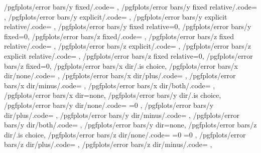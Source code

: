 {	/pgfplots/error bars/y fixed/.code=				\def\pgfplots@errorbars@yfixed{#1}\def\pgfplots@errorbars@ymode{0},
	/pgfplots/error bars/y fixed relative/.code=		\def\pgfplots@errorbars@yrel{#1}\def\pgfplots@errorbars@ymode{1},
	/pgfplots/error bars/y explicit/.code=			\def\pgfplots@errorbars@ymode{2},
	/pgfplots/error bars/y explicit relative/.code=	\def\pgfplots@errorbars@ymode{3},
	/pgfplots/error bars/y fixed relative=0,
	/pgfplots/error bars/y fixed=0,
	/pgfplots/error bars/z fixed/.code=				\def\pgfplots@errorbars@zfixed{#1}\def\pgfplots@errorbars@zmode{0},
	/pgfplots/error bars/z fixed relative/.code=		\def\pgfplots@errorbars@zrel{#1}\def\pgfplots@errorbars@zmode{1},
	/pgfplots/error bars/z explicit/.code=			\def\pgfplots@errorbars@zmode{2},
	/pgfplots/error bars/z explicit relative/.code=	\def\pgfplots@errorbars@zmode{3},
	/pgfplots/error bars/z fixed relative=0,
	/pgfplots/error bars/z fixed=0,
	/pgfplots/error bars/x dir/.is choice,
	/pgfplots/error bars/x dir/none/.code={%
		\def\pgfplots@errorbars@xdirection{0}%
		\ifnum{}
			\ifnum{}
				\pgfplots@errorbars@enabledfalse
			\fi
		\fi
	},
	/pgfplots/error bars/x dir/plus/.code=				\def\pgfplots@errorbars@xdirection{1}\pgfplots@errorbars@enabledtrue,
	/pgfplots/error bars/x dir/minus/.code=				\def\pgfplots@errorbars@xdirection{2}\pgfplots@errorbars@enabledtrue,
	/pgfplots/error bars/x dir/both/.code=				\def\pgfplots@errorbars@xdirection{3}\pgfplots@errorbars@enabledtrue,
	/pgfplots/error bars/x dir=none,
	/pgfplots/error bars/y dir/.is choice,
	/pgfplots/error bars/y dir/none/.code={%
		\def\pgfplots@errorbars@ydirection{0}%
		\ifnum\pgfplots@errorbars@xdirection=0
			\ifnum{}
				\pgfplots@errorbars@enabledfalse
			\fi
		\fi
	},
	/pgfplots/error bars/y dir/plus/.code=				\def\pgfplots@errorbars@ydirection{1}\pgfplots@errorbars@enabledtrue,
	/pgfplots/error bars/y dir/minus/.code=				\def\pgfplots@errorbars@ydirection{2}\pgfplots@errorbars@enabledtrue,
	/pgfplots/error bars/y dir/both/.code=				\def\pgfplots@errorbars@ydirection{3}\pgfplots@errorbars@enabledtrue,
	/pgfplots/error bars/y dir=none,
	/pgfplots/error bars/z dir/.is choice,
	/pgfplots/error bars/z dir/none/.code={%
		\def\pgfplots@errorbars@zdirection{0}%
		\ifnum\pgfplots@errorbars@xdirection=0
			\ifnum\pgfplots@errorbars@ydirection=0
				\pgfplots@errorbars@enabledfalse
			\fi
		\fi
	},
	/pgfplots/error bars/z dir/plus/.code=				\def\pgfplots@errorbars@zdirection{1}\pgfplots@errorbars@enabledtrue,
	/pgfplots/error bars/z dir/minus/.code=				\def\pgfplots@errorbars@zdirection{2}\pgfplots@errorbars@enabledtrue,
}
